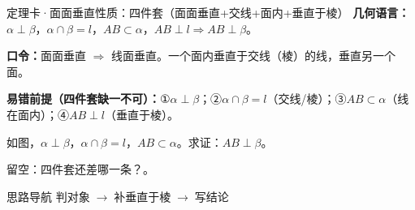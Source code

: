 \documentclass{exam-zh}
\begin{document}
\begin{eduDualExplain}
  \begin{eduExplainLeft}
  \end{eduExplainLeft}

  \begin{eduExplainRight}
  \end{eduExplainRight}
\end{eduDualExplain}





\begin{eduSolutionBox}{定理卡·面面垂直性质：四件套（面面垂直+交线+面内+垂直于棱）}
  \begingroup
  \setlength{\parskip}{2.5mm}
\textbf{几何语言：}$\alpha\perp\beta$，$\alpha\cap\beta=l$，$AB\subset\alpha$，$AB\perp l\Rightarrow AB\perp\beta$。\par
\textbf{口令：}面面垂直 $\Rightarrow$ 线面垂直。一个面内垂直于交线（棱）的线，垂直另一个面。\par
\textbf{易错前提（四件套缺一不可）：}①$\alpha\perp\beta$；②$\alpha\cap\beta=l$（交线/棱）；③$AB\subset\alpha$（线在面内）；④$AB\perp l$（垂直于棱）。\par
  \endgroup
\end{eduSolutionBox}




\begin{eduProblemBlock}[例8·面面垂直性质]
如图，$\alpha\perp\beta$，$\alpha\cap\beta=l$，$AB\subset\alpha$。求证：$AB\perp\beta$。
\par\noindent 留空：四件套还差哪一条？\underline{\hspace{20mm}}。

\end{eduProblemBlock}





\begin{eduAuxItem}{思路导航}
判对象$\;\to\;$补垂直于棱$\;\to\;$写结论\end{eduAuxItem}
\end{document}
